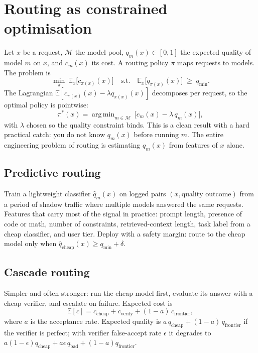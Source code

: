\documentclass[11pt,twoside,openright]{book}
\theoremstyle{definition}
\theoremstyle{plain}
\theoremstyle{remark}
\newcommand{\E}{\mathbb{E}}
\DeclareMathOperator*{\argmin}{arg\,min}
\begin{document}
\section{Routing as constrained optimisation}

Let $x$ be a request, $\mathcal{M}$ the model pool, $q_m(x)\in[0,1]$ the expected
quality of model $m$ on $x$, and $c_m(x)$ its cost. A routing policy $\pi$ maps
requests to models. The problem is
\begin{equation}
  \min_{\pi}\ \E_{x}\bigl[c_{\pi(x)}(x)\bigr]
  \quad\text{s.t.}\quad
  \E_{x}\bigl[q_{\pi(x)}(x)\bigr] \;\ge\; q_{\min}.
\label{eq:routing}
\end{equation}
The Lagrangian $\E[c_{\pi(x)}(x) - \lambda q_{\pi(x)}(x)]$ decomposes per
request, so the optimal policy is pointwise:
\begin{equation}
  \pi^{*}(x) = \argmin_{m\in\mathcal{M}}\ \bigl[c_m(x) - \lambda\, q_m(x)\bigr],
\label{eq:routing-pointwise}
\end{equation}
with $\lambda$ chosen so the quality constraint binds. This is a clean result
with a hard practical catch: you do not know $q_m(x)$ before running $m$. The
entire engineering problem of routing is estimating $q_m(x)$ from features of
$x$ alone.

\subsection{Predictive routing}

Train a lightweight classifier $\hat{q}_m(x)$ on logged pairs
$(x, \text{quality outcome})$ from a period of shadow traffic where multiple
models answered the same requests. Features that carry most of the signal in
practice: prompt length, presence of code or math, number of constraints,
retrieved-context length, task label from a cheap classifier, and user tier.
Deploy with a safety margin: route to the cheap model only when
$\hat{q}_{\text{cheap}}(x) \ge q_{\min} + \delta$.

\subsection{Cascade routing}

Simpler and often stronger: run the cheap model first, evaluate its answer with
a cheap verifier, and escalate on failure. Expected cost is
\begin{equation}
  \E[c] = c_{\text{cheap}} + c_{\text{verify}} + (1-a)\,c_{\text{frontier}},
\label{eq:cascade}
\end{equation}
where $a$ is the acceptance rate. Expected quality is
$a\,q_{\text{cheap}} + (1-a)\,q_{\text{frontier}}$ if the verifier is perfect;
with verifier false-accept rate $\epsilon$ it degrades to
$a(1-\epsilon)q_{\text{cheap}} + a\epsilon\,q_{\text{bad}} + (1-a)q_{\text{frontier}}$.
\end{document}
